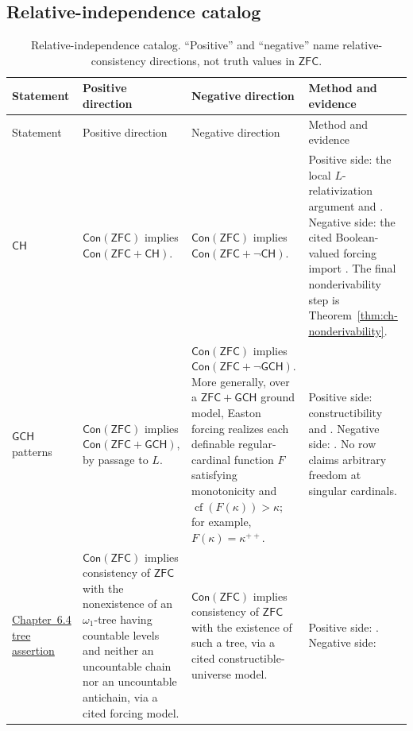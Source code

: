 \begin{landscape}
\subsection{Relative-independence catalog}
\small
\begin{longtable}{@{}p{.85in}p{1.95in}p{2.10in}p{2.10in}@{}}
\caption{Relative-independence catalog.  ``Positive'' and
``negative'' name relative-consistency directions, not truth values in
\(\mathsf{ZFC}\).}\label{tab:p06-independence-catalog}\\
\toprule
Statement & Positive direction & Negative direction & Method and evidence \\
\midrule
\endfirsthead
\toprule
Statement & Positive direction & Negative direction & Method and evidence \\
\midrule
\endhead
\(\mathsf{CH}\)
& \(\mathsf{Con}(\mathsf{ZFC})\) implies
  \(\mathsf{Con}(\mathsf{ZFC}+\mathsf{CH})\).
& \(\mathsf{Con}(\mathsf{ZFC})\) implies
  \(\mathsf{Con}(\mathsf{ZFC}+\neg\mathsf{CH})\).
& Positive side: the local \(L\)-relativization argument and
  \textcite{Godel1938}.  Negative side: the cited Boolean-valued forcing
  import \parencite{Cohen1963,Jech2003}.  The final nonderivability step is
  Theorem~\ref{thm:ch-nonderivability}. \\
\addlinespace
\(\mathsf{GCH}\) patterns
& \(\mathsf{Con}(\mathsf{ZFC})\) implies
  \(\mathsf{Con}(\mathsf{ZFC}+\mathsf{GCH})\), by passage to \(L\).
& \(\mathsf{Con}(\mathsf{ZFC})\) implies
  \(\mathsf{Con}(\mathsf{ZFC}+\neg\mathsf{GCH})\).  More generally, over a
  \(\mathsf{ZFC}+\mathsf{GCH}\) ground model, Easton forcing realizes each
  definable regular-cardinal function \(F\) satisfying monotonicity and
  \(\operatorname{cf}(F(\kappa))>\kappa\); for example,
  \(F(\kappa)=\kappa^{++}\).
& Positive side: constructibility and \textcite{Godel1938}.  Negative side:
  \textcite{Easton1970}.  No row claims arbitrary freedom at singular
  cardinals. \\
\addlinespace
\hyperref[def:p06-suslin-hypothesis]{Chapter~6.4 tree assertion}
& \(\mathsf{Con}(\mathsf{ZFC})\) implies consistency of \(\mathsf{ZFC}\) with
  the nonexistence of an \(\omega_1\)-tree having countable levels and neither
  an uncountable chain nor an uncountable antichain, via a cited forcing model.
& \(\mathsf{Con}(\mathsf{ZFC})\) implies consistency of \(\mathsf{ZFC}\) with
  the existence of such a tree, via a cited constructible-universe model.
& Positive side: \textcite{MartinSolovay1970,Jech2003}.  Negative side:

\end{longtable}
\end{landscape}

